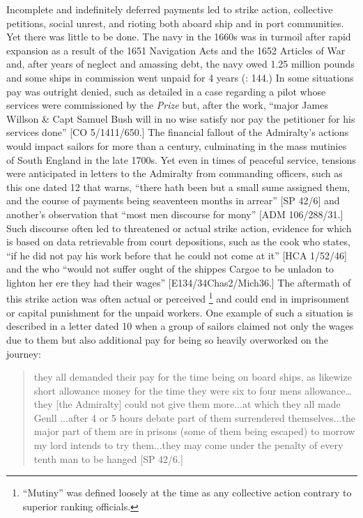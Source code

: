 Incomplete and indefinitely deferred payments led to strike action, collective petitions, social unrest, and rioting both aboard ship and in port communities. Yet there was little to be done. The navy in the 1660s was in turmoil after rapid expansion as a result of the 1651 Navigation Acts and the 1652 Articles of War and, after years of neglect and amassing debt, the navy owed 1.25 million pounds and some ships in commission went unpaid for 4 years (\citealt{Lincoln2015}: 144.) In some situations pay was outright denied, such as detailed in a case regarding a pilot whose services were commissioned by the \textit{ Prize} but, after the work, “major James Willson \& Capt Samuel Bush will in no wise satisfy nor pay the petitioner for his services done” [CO 5/1411/650.] The financial fallout of the Admiralty’s actions would impact sailors for more than a century, culminating in the mass mutinies of South England in the late 1700s. Yet even in times of peaceful service, tensions were anticipated in letters to the Admiralty from commanding officers, such as this one dated 12 \citealt{March1700} that warns, “there hath been but a small sume assigned them, and the course of payments being seaventeen months in arrear” [SP 42/6] and another’s observation that “most men discourse for mony” [ADM 106/288/31.] Such discourse often led to threatened or actual strike action, evidence for which is based on data retrievable from court depositions, such as the cook who states, “if he did not pay his work before that he could not come at it” [HCA 1/52/46] and the  who “would not suffer ought of the shippes Cargoe to be unladon to lighton her ere they had their wages” [E134/34Chas2/Mich36.] The aftermath of this strike action was often actual or perceived \footnote{“Mutiny” was defined loosely at the time as any collective action contrary to superior ranking officials.} and could end in imprisonment or capital punishment for the unpaid workers. One example of such a situation is described in a letter dated 10 \citealt{December1700} when a group of sailors claimed not only the wages due to them but also additional pay for being so heavily overworked on the journey:

\begin{quotation}
they all demanded their pay for the time being on board ships, as likewize short allowance money for the time they were six to four mens allowance… they [the Admiralty] could not give them more...at which they all made Genll ...after 4 or 5 hours debate part of them surrendered themselves...the major part of them are in prisons (some of them being escaped) to morrow my lord intends to try them...they may come under the penalty of every tenth man to be hanged [SP 42/6.]\end{quotation}

